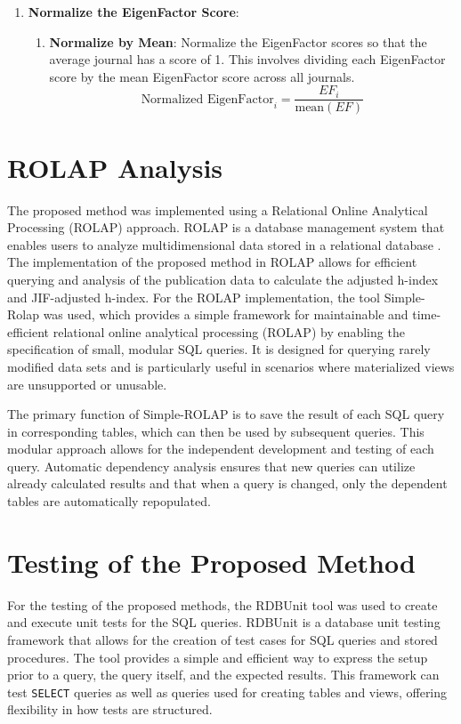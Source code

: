 \begin{enumerate}
      \item \textbf{Normalize the EigenFactor Score}:
            \begin{enumerate}
                  \item \textbf{Normalize by Mean}: Normalize the EigenFactor scores so that the average journal has a score of 1. This involves dividing each EigenFactor score by the mean EigenFactor score across all journals.
                        \[
                              \text{Normalized EigenFactor}_i = \frac{EF_i}{\text{mean}(EF)}
                        \]
            \end{enumerate}
\end{enumerate}

\section{ROLAP Analysis}

The proposed method was implemented using a Relational Online Analytical
Processing (ROLAP) approach. ROLAP is a database management system that enables
users to analyze multidimensional data stored in a relational database
\cite{codd1993providing}. The implementation of the proposed method in ROLAP
allows for efficient querying and analysis of the publication data to calculate
the adjusted h-index and JIF-adjusted h-index. For the ROLAP implementation,
the tool Simple-Rolap \cite{simple-rolap} was used, which provides a simple
framework for maintainable and time-efficient relational online analytical
processing (ROLAP) by enabling the specification of small, modular SQL queries.
It is designed for querying rarely modified data sets and is particularly
useful in scenarios where materialized views are unsupported or unusable.

The primary function of Simple-ROLAP is to save the result of each SQL query in
corresponding tables, which can then be used by subsequent queries. This
modular approach allows for the independent development and testing of each
query. Automatic dependency analysis ensures that new queries can utilize
already calculated results and that when a query is changed, only the dependent
tables are automatically repopulated.

\section{Testing of the Proposed Method}
For the testing of the proposed methods, the RDBUnit \cite{rdbunit} tool was
used to create and execute unit tests for the SQL queries. RDBUnit is a
database unit testing framework that allows for the creation of test cases for
SQL queries and stored procedures. The tool provides a simple and efficient way
to express the setup prior to a query, the query itself, and the expected
results. This framework can test \texttt{SELECT} queries as well as queries
used for creating tables and views, offering flexibility in how tests are
structured.


